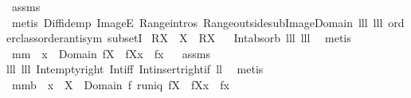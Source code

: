 \begin{isabellebody}
%
\endisadelimproof
%
\isatagproof
{}\isamarkupfalse%
\ assms\ \isamarkupfalse%
\ {\isacharparenleft}metis\ Diff{\isacharunderscore}idemp\ ImageE\ Range{\isachardot}intros\ Range{\isacharunderscore}outside{\isacharunderscore}sub{\isacharunderscore}Image{\isacharunderscore}Domain\ lll{}{}\ lll{}{}\ order{\isacharunderscore}class{\isachardot}order{\isachardot}antisym\ subsetI{\isacharparenright}%
\endisatagproof
{\isafoldproof}%
%
\isadelimproof
\isanewline
%
\endisadelimproof
\isanewline
{}\isamarkupfalse%
\ {\isachardoublequoteopen}{\isacharparenleft}R{\isacharbar}{\isacharbar}X{\isacharparenright}\ {\isacharbackquote}{\isacharbackquote}\ X\ {\isacharequal}\ R{\isacharbackquote}{\isacharbackquote}X{\isachardoublequoteclose}%
\isadelimproof
\ %
\endisadelimproof
%
\isatagproof
{}\isamarkupfalse%
\ Int{\isacharunderscore}absorb\ lll{}{}\ lll{}{}\ \isamarkupfalse%
\ metis%
\endisatagproof
{\isafoldproof}%
%
\isadelimproof
%
\endisadelimproof
\isanewline
{}\isamarkupfalse%
\ mm{}{}{\isacharcolon}\ \ {\isachardoublequoteopen}x\ {\isasymin}\ Domain\ {\isacharparenleft}f{\isacharbar}{\isacharbar}X{\isacharparenright}{\isachardoublequoteclose}\ \ {\isachardoublequoteopen}{\isacharparenleft}f{\isacharbar}{\isacharbar}X{\isacharparenright}{\isacharbackquote}{\isacharbackquote}{\isacharbraceleft}x{\isacharbraceright}\ {\isacharequal}\ f{\isacharbackquote}{\isacharbackquote}{\isacharbraceleft}x{\isacharbraceright}{\isachardoublequoteclose}%
\isadelimproof
\ %
\endisadelimproof
%
\isatagproof
{}\isamarkupfalse%
\ assms\isanewline
lll{}{}\ lll{}{}\ Int{\isacharunderscore}empty{\isacharunderscore}right\ Int{\isacharunderscore}iff\ Int{\isacharunderscore}insert{\isacharunderscore}right{\isacharunderscore}if{}\ ll{}{}\ \isamarkupfalse%
\ metis%
\endisatagproof
{\isafoldproof}%
%
\isadelimproof
%
\endisadelimproof
\isanewline
{}\isamarkupfalse%
\ mm{}{}b{\isacharcolon}\ \ {\isachardoublequoteopen}x\ {\isasymin}\ X\ {\isasyminter}\ Domain\ f{\isachardoublequoteclose}\ {\isachardoublequoteopen}runiq\ {\isacharparenleft}f{\isacharbar}{\isacharbar}X{\isacharparenright}{\isachardoublequoteclose}\ \ {\isachardoublequoteopen}{\isacharparenleft}f{\isacharbar}{\isacharbar}X{\isacharparenright}{\isacharcomma}{\isacharcomma}x\ {\isacharequal}\ f{\isacharcomma}{\isacharcomma}x{\isachardoublequoteclose}\ \isanewline

\end{isabellebody}
